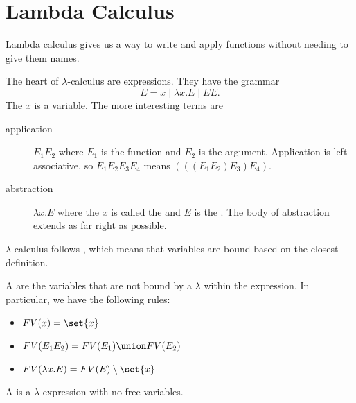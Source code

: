 \documentclass[class=scrartcl]{standalone}
\begin{document}
\section{Lambda Calculus}
Lambda calculus gives us a way to write and apply functions without
needing to give them names.

The heart of \(\lambda\)-calculus are expressions.
They have the grammar
\[
  E = x
    \mid \lambda x . E
    \mid E E.
\]
The \(x\) is a variable.
The more interesting terms are
\begin{description}
  \item[application] \(E_1 E_2\)
    where \(E_1\) is the function
    and \(E_2\) is the argument.
    Application is left-associative,
    so \(E_1 E_2 E_3 E_4\) means \((((E_1 E_2) E_3) E_4)\).
  \item[abstraction] \(\lambda x. E\)
    where the \(x\) is called the 
    and \(E\) is the .
    The body of abstraction extends as far right as possible.
\end{description}

\(\lambda\)-calculus follows ,
which means that variables are bound based on the closest definition.

A  are the variables that
are not bound by a \(\lambda\) within the expression.
In particular, we have the following rules:
\begin{itemize}
  \item \(FV(x) = \set{x}\)
  \item \(FV(E_1 E_2) = FV(E_1) \union FV(E_2)\)
  \item \(FV(\lambda x. E) = FV(E) \setminus \set{x}\)
\end{itemize}
A  is a \(\lambda\)-expression with no free variables.
\end{document}
